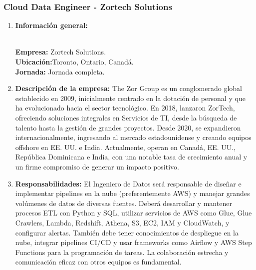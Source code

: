 \documentclass[12pt]{article}
\begin{document}
            \subsubsection{Cloud Data Engineer - Zortech Solutions}
                \begin{enumerate}
                    \item \textbf{Información general:}
                    
                        \textbf{\\Empresa:} Zortech Solutions.
                        \textbf{\\Ubicación:}Toronto, Ontario, Canadá.
                        \textbf{\\Jornada:} Jornada completa.

                    \item \textbf{Descripción de la empresa:}
                        The Zor Group es un conglomerado global establecido en 2009, inicialmente centrado en la dotación de personal y que ha evolucionado hacia el sector tecnológico. En 2018, lanzaron ZorTech, ofreciendo soluciones integrales en Servicios de TI, desde la búsqueda de talento hasta la gestión de grandes proyectos. Desde 2020, se expandieron internacionalmente, ingresando al mercado estadounidense y creando equipos offshore en EE. UU. e India. Actualmente, operan en Canadá, EE. UU., República Dominicana e India, con una notable tasa de crecimiento anual y un firme compromiso de generar un impacto positivo.

                    \item \textbf{Responsabilidades:}
                        El Ingeniero de Datos será responsable de diseñar e implementar pipelines en la nube (preferentemente AWS) y manejar grandes volúmenes de datos de diversas fuentes. Deberá desarrollar y mantener procesos ETL con Python y SQL, utilizar servicios de AWS como Glue, Glue Crawlers, Lambda, Redshift, Athena, S3, EC2, IAM y CloudWatch, y configurar alertas. También debe tener conocimientos de despliegue en la nube, integrar pipelines CI/CD y usar frameworks como Airflow y AWS Step Functions para la programación de tareas. La colaboración estrecha y comunicación eficaz con otros equipos es fundamental.


\end{enumerate}
\end{document}
